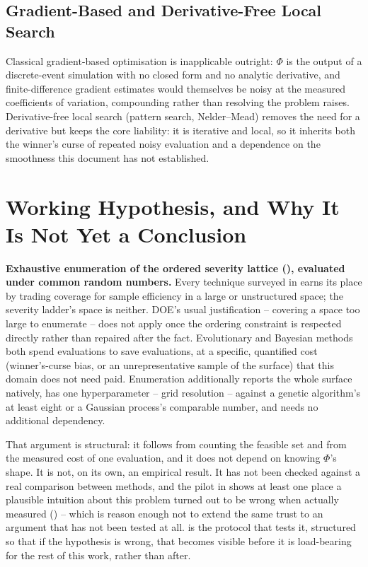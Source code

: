 \documentclass{article}
\begin{document}
\subsection{Gradient-Based and Derivative-Free Local Search}

Classical gradient-based optimisation is inapplicable outright: $\Phi$ is the
output of a discrete-event simulation with no closed form and no analytic
derivative, and finite-difference gradient estimates would themselves be noisy
at the measured coefficients of variation, compounding rather than resolving
the problem  raises. Derivative-free local search
(pattern search, Nelder--Mead) removes the need for a derivative but keeps the
core liability: it is iterative and local, so it inherits both the winner's
curse of repeated noisy evaluation and a dependence on the smoothness this
document has not established.

\section{Working Hypothesis, and Why It Is Not Yet a Conclusion}
\label{sec:hypothesis}

\textbf{Exhaustive enumeration of the ordered severity lattice
(), evaluated under common random numbers.} Every
technique surveyed in  earns its place by trading
coverage for sample efficiency in a large or unstructured space; the severity
ladder's space is neither. DOE's usual justification -- covering a space too
large to enumerate -- does not apply once the ordering constraint is
respected directly rather than repaired after the fact. Evolutionary and
Bayesian methods both spend evaluations to save evaluations, at a specific,
quantified cost (winner's-curse bias, or an unrepresentative sample of the
surface) that this domain does not need paid. Enumeration additionally
reports the whole surface natively, has one hyperparameter -- grid resolution
-- against a genetic algorithm's at least eight or a Gaussian process's
comparable number, and needs no additional dependency.

That argument is structural: it follows from counting the feasible set and
from the measured cost of one evaluation, and it does not depend on knowing
$\Phi$'s shape. It is not, on its own, an empirical result. It has not been
checked against a real comparison between methods, and the pilot in
 shows at least one place a plausible intuition about this
problem turned out to be wrong when actually measured
() -- which is reason enough not to extend the same trust to
an argument that has not been tested at all.  is the
protocol that tests it, structured so that if the hypothesis is wrong, that
becomes visible before it is load-bearing for the rest of this work, rather
than after.
\end{document}
